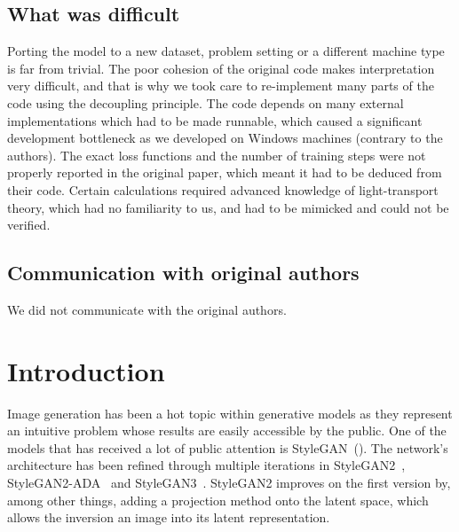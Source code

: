 \subsection*{What was difficult}
Porting the model to a new dataset, problem setting or a different machine type is far from trivial. The poor cohesion of the original code makes interpretation very difficult, and that is why we took care to re-implement many parts of the code using the decoupling principle. The code depends on many external implementations which had to be made runnable, which caused a significant development bottleneck as we developed on Windows machines (contrary to the authors). The exact loss functions and the number of training steps were not properly reported in the original paper, which meant it had to be deduced from their code. Certain calculations required advanced knowledge of light-transport theory, which had no familiarity to us, and had to be mimicked and could not be verified.

\subsection*{Communication with original authors}
We did not communicate with the original authors.
\newpage

\section{Introduction}
Image generation has been a hot topic within generative models as they represent an intuitive problem whose results are easily accessible by the public. One of the models that has received a lot of public attention is StyleGAN~(\textcite{stylegan}). 
The network's architecture has been refined through multiple iterations in StyleGAN2~\cite{stylegan2}, StyleGAN2-ADA~\cite{stylegan2-ada} and StyleGAN3~\cite{stylegan3}. StyleGAN2 improves on the first version by, among other things, adding a projection method onto the latent space, which allows the inversion an image into its latent representation. 

